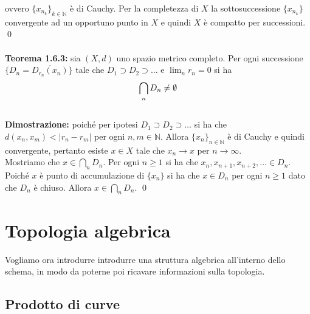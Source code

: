 \documentclass{article}
\begin{document}
ovvero $\{x_{n_k}\}_{k \in \mathbb{N}}$ è di Cauchy. Per la completezza di $X$ la sottosuccessione $\{x_{n_k}\}$ convergente ad un opportuno punto in $X$ e quindi $X$ è compatto per successioni. \qed \\ \\
\textbf{Teorema 1.6.3:} sia $(X, d)$ uno spazio metrico completo. Per ogni successione $\{D_n = \overline{{D}_{r_n}(x_n)}\}$ tale che $D_1 \supset D_2 \supset \dots$ e $\lim_n r_n = 0$ si ha 
\begin{align}
    \bigcap_{n}D_n \neq \emptyset \notag
\end{align} \\

\textbf{Dimostrazione:} poiché per ipotesi $D_1 \supset D_2 \supset \dots$ si ha che $d(x_n, x_m) < |r_n - r_m|$ per ogni $n, m \in \mathbb{N}$. Allora $\{x_n\}_{n \in \mathbb{N}}$ è di Cauchy e quindi convergente, pertanto esiste $x \in X$ tale che $x_n \rightarrow x$ per $n \rightarrow \infty$. \\
Mostriamo che $x \in \bigcap_n D_n$. Per ogni $n \geq 1$ si ha che $x_n, x_{n + 1}, x_{n + 2}, \dots \in D_n$. Poiché $x$ è punto di accumulazione di $\{x_n\}$ si ha che $x \in D_n$ per ogni $n \geq 1$ dato che $D_n$ è chiuso. Allora $x \in \bigcap_n D_n$. \qed

\newpage
\section{Topologia algebrica}
Vogliamo ora introdurre introdurre una struttura algebrica all'interno dello schema, in modo da poterne poi ricavare informazioni sulla topologia.

\subsection{Prodotto di curve}
\end{document}
